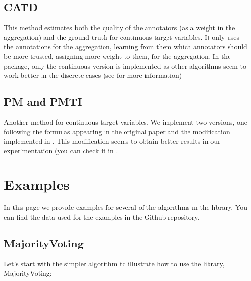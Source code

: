 \documentclass[letterpaper,10pt,english]{sphinxmanual}
\begin{document}
\section{CATD}
\label{\detokenize{package/methods:id7}}
This method estimates both the quality of the annotators (as a weight in the aggregation) and the ground truth
for continuous target variables. It only uses the annotations for the aggregation, learning from them which
annotators should be more trusted, assigning more weight to them, for the aggregation. In the package, only
the continuous version is implemented as other algorithms seem to work better in the discrete cases (see  for more information)


\section{PM and PMTI}
\label{\detokenize{package/methods:pm-and-pmti}}
Another method for continuous target variables. We implement two versions, one following the formulas appearing
in the original paper and the modification implemented in  . This modification seems to obtain better results in our experimentation (you can check it in {\hyperref[\detokenize{package/other:comparison}]{}}.


\chapter{Examples}
\label{\detokenize{usage/examples:examples}}\label{\detokenize{usage/examples::doc}}
In this page we provide examples for several of the algorithms in the library.
You can find the data used for the examples in the Github repository.


\section{MajorityVoting}
\label{\detokenize{usage/examples:majorityvoting}}
Let’s start with the simpler algorithm to illustrate how to use the library, MajorityVoting:
\end{document}
